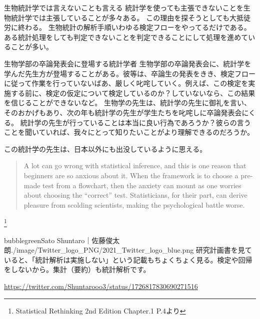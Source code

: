 \begin{SMbox}{生物統計学では言えないことも言える}
統計学を使っても主張できないことを生物統計学では主張していることが多々ある。
この理由を探そうとしても大抵徒労に終わる。
生物統計の解析手順いわゆる検定フローをやってるだけである。
ある統計処理をしても判定できないことを判定できることにして処理を進めていることが多い。
\end{SMbox}


\begin{SMbox}{生物学部の卒論発表会に登場する統計学者}
 生物学部の卒論発表会に、統計学を学んだ先生方が登場することがある。彼等は、卒論生の発表をきき、検定フローに従って作業を行っていないばあ、厳しく叱咤していく。例えば、この検定を実施する前に、検定の仮定について検定しているのか？していないなら、この結果を信じることができないなど。
 生物学の先生は、統計学の先生に御礼を言い、そのおかげもあり、次の年も統計学の先生が学生たちを叱咤しに卒論発表会にくる。
 統計学の先生が行っていることは本当に良い行為であろうか？彼らの言うことを聞いていれば、我々にとって知りたいことがより理解できるのだろうか。

 この統計学の先生は、日本以外にも出没しているように思える。
 \begin{quote}
  A lot can go wrong with statistical inference, and this is one reason that beginners are so anxious about it. When the framework is to choose a pre-made test from a flowchart, then the anxiety can mount as one worries about choosing the “correct” test. Statisticians, for their part, can derive pleasure from scolding scientists, making the psychological battle worse.
 \end{quote}\footnote{Statistical Rethinking 2nd Edition Chapter.1 P.4より}

\end{SMbox}


\begin{rightbubbles}{bubblegreen}{Sato Shuntaro｜佐藤俊太朗}{./image/Twitter_logo_PNG/2021_Twitter_logo_blue.png}
研究計画書を見ていると、「統計解析は実施しない」という記載もちょくちょく見る。検定や回帰をしないから。集計（要約）も統計解析です。
  
\begin{flushright} 
\small	\url{https://twitter.com/Shuntarooo3/status/1726817830690271516}
\end{flushright}    
\end{rightbubbles}


